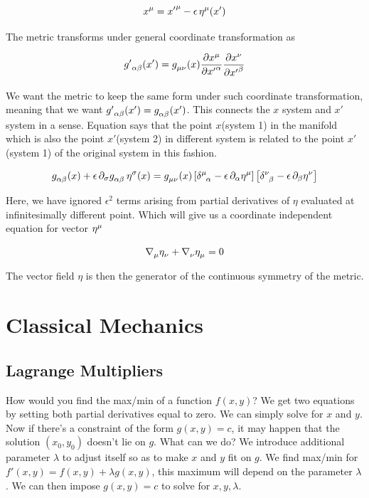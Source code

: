 \documentclass{report}
\begin{document}
$$x\indices{^\mu} = {x'}\indices{^\mu} - \epsilon \, \eta\indices{^\mu}(x')$$

\noindent The metric transforms under general coordinate transformation as 

$${g'}\indices{_\alpha_ \beta}(x') = g\indices{_\mu _\nu}(x)\frac{\partial x\indices{^\mu}}{\partial {x'}\indices{^\alpha}} \frac{\partial x\indices{^\nu}}{\partial {x'}\indices{^\beta}}$$

\noindent We want the metric to keep the same form under such coordinate transformation, meaning that we want ${g'}\indices{_\alpha_ \beta}(x') = g\indices{_\alpha_ \beta}(x')$. This connects the $x$ system and $x'$ system in a sense. Equation says that the point $x$(system 1) in the manifold which is also the point $x'$(system 2) in different system is related to the point $x'$(system 1) of the original system in this fashion. 

$$g\indices{_\alpha_ \beta}(x) + \epsilon \, \partial_\sigma g\indices{_\alpha_ \beta} \, \eta\indices{^\sigma}(x)= g\indices{_\mu_ \nu}(x) \left[\delta\indices{^\mu_\alpha} -\epsilon \, \partial_\alpha\eta\indices{^\mu}\right] \left[\delta\indices{^\nu_ \beta} -\epsilon \, \partial_ \beta\eta\indices{^\nu}\right]  $$

\noindent Here, we have ignored $\epsilon^2$ terms arising from partial derivatives of $\eta$ evaluated at infinitesimally different point. Which will give us a coordinate independent equation for vector $\eta\indices{^\mu}$

\begin{equation}
\nabla\indices{_\mu}\eta\indices{_\nu} + \nabla\indices{_\nu}\eta\indices{_\mu} = 0 
\end{equation}

\noindent The vector field $\eta$ is then the generator of the continuous symmetry of the metric.


\chapter{Classical Mechanics}

\section{Lagrange Multipliers}

How would you find the max/min of a function $f(x,y)$? We get two equations by setting both partial derivatives equal to zero. We can simply solve for $x$ and $y$. Now if there's a constraint of the form $g(x,y)=c$, it may happen that the solution $(x_0,y_0)$ doesn't lie on $g$. What can we do? We introduce additional parameter $\lambda$ to adjust itself so as to make $x$ and $y$ fit on $g$. We find max/min for $f'(x,y)=f(x,y)+\lambda g(x,y)$, this maximum will depend on the parameter $\lambda$. We can then impose $g(x,y)=c$ to solve for $x,y,\lambda$. \\
\end{document}
